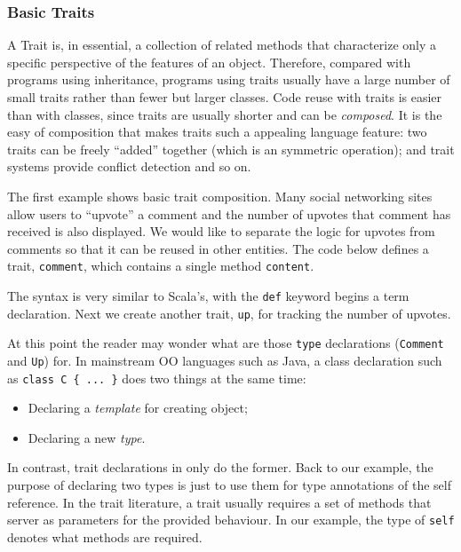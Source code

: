 \subsubsection{Basic Traits}

A Trait is, in essential, a collection of related methods that characterize only
a specific perspective of the features of an object. Therefore, compared with
programs using inheritance, programs using traits usually have a large number of
small traits rather than fewer but larger classes. Code reuse with traits is
easier than with classes, since traits are usually shorter and can be
\textit{composed}. It is the easy of composition that makes traits such a
appealing language feature: two traits can be freely ``added'' together (which
is an symmetric operation); and trait systems provide conflict detection and so
on.

The first example shows basic trait composition. Many social networking sites
allow users to ``upvote'' a comment and the number of upvotes that comment has
received is also displayed. We would like to separate the logic for upvotes from
comments so that it can be reused in other entities. The code below defines a
trait, \lstinline$comment$, which contains a single method \lstinline$content$.


The syntax is very similar to Scala's, with the \lstinline{def} keyword begins a
term declaration. Next we create another trait, \lstinline$up$, for tracking the
number of upvotes.


At this point the reader may wonder what are those \lstinline{type} declarations
(\lstinline$Comment$ and \lstinline$Up$) for. In mainstream OO languages such as
Java, a class declaration such as \lstinline$class C { ... }$ does two things at
the same time:

\begin{itemize}
\item Declaring a \textit{template} for creating object;
\item Declaring a new \textit{type}.
\end{itemize}

In contrast, trait declarations in \name only do the former. Back to our
example, the purpose of declaring two types is just to use them for type
annotations of the self reference. In the trait literature, a trait usually
requires a set of methods that server as parameters for the provided behaviour.
In our example, the type of \lstinline$self$ denotes what methods are required.

